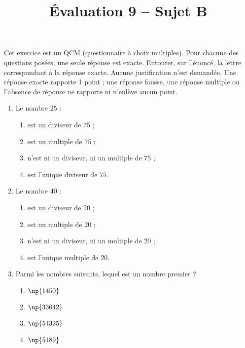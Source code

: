 \documentclass[a4paper,dvipsnames]{article}
\begin{document}
\title{Évaluation 9 -- Sujet B}
\author{}
\date{}

\maketitle{}

\pagestyle{empty}
\thispagestyle{empty}

\exo[3 points] Cet exercice est un QCM (questionnaire à choix multiples). Pour chacune des questions posées, une seule réponse est exacte. Entourer, sur l'énoncé, la lettre correspondant à la réponse exacte. Aucune justification n'est demandée. Une réponse exacte rapporte 1 point ; une réponse fausse, une réponse multiple ou l'absence de réponse ne rapporte ni n'enlève aucun point.

\begin{enumerate}
  \item Le nombre $25$ :
    \vspace{-3mm}
    \begin{multicols}{2}
      \begin{enumerate}
	\item est un diviseur de $75$ ;
	\item est un multiple de $75$ ;
	\item n'est ni un diviseur, ni un multiple de $75$ ;
	\item est l'unique diviseur de $75$.
      \end{enumerate} 
    \end{multicols}
  \item Le nombre $40$ :
    \vspace{-3mm}
    \begin{multicols}{2}
      \begin{enumerate}
	\item est un diviseur de $20$ ;
	\item est un multiple de $20$ ;
	\item n'est ni un diviseur, ni un multiple de $20$ ;
	\item est l'unique multiple de $20$.
      \end{enumerate} 
    \end{multicols}
  \item Parmi les nombres suivants, lequel est un nombre premier ?
    \vspace{-3mm}
    \begin{multicols}{4}
      \begin{enumerate}
	\item $\np{1450}$
	\item $\np{33642}$
	\item $\np{54325}$
	\item $\np{5189}$
      \end{enumerate} 
    \end{multicols}
\end{enumerate}
\end{document}
